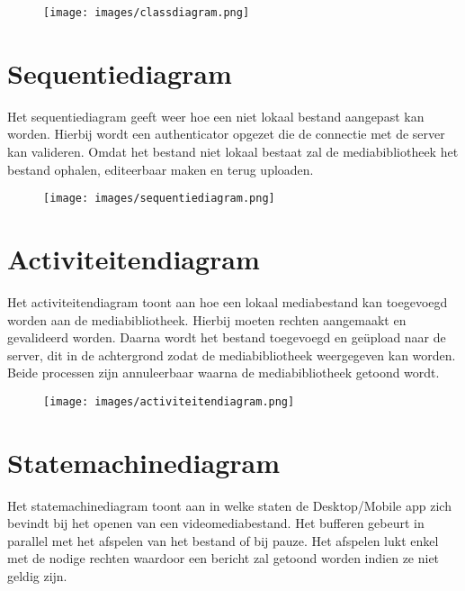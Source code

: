 \begin{figure}[H]
  \centering
  \texttt{[image: images/classdiagram.png]}
  \label{figure:classdiagram}
\end{figure}

\newpage

\section{Sequentiediagram}
\label{sec:sequentie}

Het sequentiediagram geeft weer hoe een niet lokaal bestand aangepast kan worden.
Hierbij wordt een authenticator opgezet die de connectie met de server kan valideren.
Omdat het bestand niet lokaal bestaat zal de mediabibliotheek het bestand ophalen, editeerbaar maken en terug uploaden.

\begin{figure}[H]
  \centering
  \texttt{[image: images/sequentiediagram.png]}
  \label{figure:sequentiediagram}
\end{figure}

\newpage

\section{Activiteitendiagram}
\label{sec:activiteiten}

Het activiteitendiagram toont aan hoe een lokaal mediabestand kan toegevoegd worden
aan de mediabibliotheek. Hierbij moeten rechten aangemaakt en gevalideerd worden.
Daarna wordt het bestand toegevoegd en geüpload naar de server, dit in de achtergrond zodat
de mediabibliotheek weergegeven kan worden. Beide processen zijn 
annuleerbaar waarna de mediabibliotheek getoond wordt.

\begin{figure}[H]
  \centering
  \texttt{[image: images/activiteitendiagram.png]}
  \label{figure:activiteitendiagram}
\end{figure}

\newpage

\section{Statemachinediagram}
\label{sec:statemachine}

Het statemachinediagram toont aan in welke staten de Desktop/Mobile app zich 
bevindt bij het openen van een videomediabestand. 
Het bufferen gebeurt in parallel met het afspelen van het bestand of bij pauze.
Het afspelen lukt enkel met de nodige rechten waardoor een bericht zal getoond worden
indien ze niet geldig zijn.

